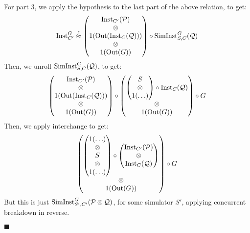 \begin{theorem}
  For part 3, we apply the hypothesis to the last part of the above relation, to get:
  $$
  \text{Inst}^G_{C'} \overset{\epsilon}{\approx}
  \begin{pmatrix}
    \text{Inst}_{C'}(\mathcal{P})\cr
    \otimes\cr
    1(\text{Out}(\text{Inst}_C(\mathcal{Q})))\cr
    \otimes\cr
    1(\text{Out}(G))
  \end{pmatrix}
  \circ
  \text{SimInst}^G_{S, C}(\mathcal{Q})
  $$
  Then, we unroll $\text{SimInst}^G_{S, C}(\mathcal{Q})$, to get:
  $$
  \begin{pmatrix}
    \text{Inst}_{C'}(\mathcal{P})\cr
    \otimes\cr
    1(\text{Out}(\text{Inst}_C(\mathcal{Q})))\cr
    \otimes\cr
    1(\text{Out}(G))
  \end{pmatrix}
  \circ
  \begin{pmatrix}
    \begin{pmatrix}
      S\cr
      \otimes\cr
      1(\ldots)\cr
    \end{pmatrix}
    \circ \text{Inst}_C(\mathcal{Q})\cr
    \otimes\cr
    1(\text{Out}(G))
  \end{pmatrix}
  \circ G
  $$
  Then, we apply interchange to get:
  $$
  \begin{pmatrix}
    \begin{pmatrix}
      1(\ldots)\cr
      \otimes\cr
      S\cr
      \otimes\cr
      1(\ldots)\cr
    \end{pmatrix}
    \circ
    \begin{pmatrix}
    \text{Inst}_{C'}(\mathcal{P})\cr
    \otimes\cr
    \text{Inst}_C(\mathcal{Q})\cr
    \end{pmatrix}\cr
    \otimes\cr
    1(\text{Out}(G))
  \end{pmatrix}
  \circ G
  $$
  But this is just $\text{SimInst}^G_{S', C'}(\mathcal{P} \otimes \mathcal{Q})$,
  for some simulator $S'$,
  applying concurrent breakdown in reverse.

  $\blacksquare$
\end{theorem}

